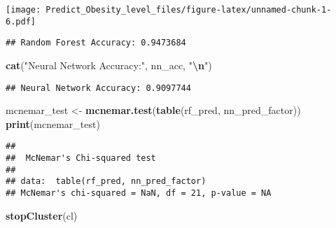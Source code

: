 \documentclass[
]{article}
\newenvironment{Shaded}{\begin{snugshade}}{\end{snugshade}}
\newcommand{\AttributeTok}[1]{\textcolor[rgb]{0.13,0.29,0.53}{#1}}
\newcommand{\ControlFlowTok}[1]{\textcolor[rgb]{0.13,0.29,0.53}{\textbf{#1}}}
\newcommand{\DecValTok}[1]{\textcolor[rgb]{0.00,0.00,0.81}{#1}}
\newcommand{\FunctionTok}[1]{\textcolor[rgb]{0.13,0.29,0.53}{\textbf{#1}}}
\newcommand{\NormalTok}[1]{#1}
\newcommand{\OtherTok}[1]{\textcolor[rgb]{0.56,0.35,0.01}{#1}}
\newcommand{\SpecialCharTok}[1]{\textcolor[rgb]{0.81,0.36,0.00}{\textbf{#1}}}
\newcommand{\StringTok}[1]{\textcolor[rgb]{0.31,0.60,0.02}{#1}}
\begin{document}
\texttt{[image: Predict\_Obesity\_level\_files/figure-latex/unnamed-chunk-1-6.pdf]}

\begin{Shaded}
\end{Shaded}

\begin{verbatim}
## Random Forest Accuracy: 0.9473684
\end{verbatim}

\begin{Shaded}
\begin{Highlighting}[]
\FunctionTok{cat}\NormalTok{(}\StringTok{"Neural Network Accuracy:"}\NormalTok{, nn\_acc, }\StringTok{"}\SpecialCharTok{\textbackslash{}n}\StringTok{"}\NormalTok{)}
\end{Highlighting}
\end{Shaded}

\begin{verbatim}
## Neural Network Accuracy: 0.9097744
\end{verbatim}

\begin{Shaded}
\begin{Highlighting}[]
\NormalTok{mcnemar\_test }\OtherTok{\textless{}{-}} \FunctionTok{mcnemar.test}\NormalTok{(}\FunctionTok{table}\NormalTok{(rf\_pred, nn\_pred\_factor))}
\FunctionTok{print}\NormalTok{(mcnemar\_test)}
\end{Highlighting}
\end{Shaded}

\begin{verbatim}
## 
##  McNemar's Chi-squared test
## 
## data:  table(rf_pred, nn_pred_factor)
## McNemar's chi-squared = NaN, df = 21, p-value = NA
\end{verbatim}

\begin{Shaded}
\begin{Highlighting}[]
\FunctionTok{stopCluster}\NormalTok{(cl)}
\end{Highlighting}
\end{Shaded}
\end{document}
